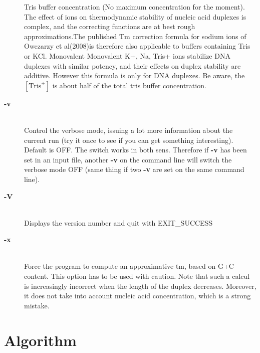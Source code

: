 \documentclass{article}
\begin{document}
\begin{description}
Tris buffer  concentration  (No maximum concentration for the moment). 
The effect  of  ions  on  thermodynamic  stability  of nucleic  acid 
duplexes is complex, and the correcting functions are  at  best
rough  approximations.The published  Tm  correction formula for sodium ions of 
Owczarzy et al(2008)is therefore also applicable to buffers containing Tris or
KCl. Monovalent Monovalent K+, Na, Tris+ ions  stabilize  DNA duplexes with similar potency, and 
their effects on duplex stability are additive. However this formula is only for DNA 
duplexes. Be aware, the $[\mbox{Tris}^+]$ is about half of the total tris buffer
concentration.
\item [\textbf{-v}  ]\mbox{}\\ 
Control the verbose 
mode, issuing a lot more information about the current run  (try it once 
to see if you can get something interesting). Default is OFF. The  switch 
works in both sens. Therefore if  \textbf{-v } has been set in an input file, another 
\textbf{-v } on the command line will switch the verbose mode OFF (same thing if 
two  \textbf{-v } are set on the same command line).  
\item [\textbf{-V}  ]\mbox{}\\ 
Displays the version number 
and quit with EXIT\_SUCCESS 
\item [\textbf{-x}  ]\mbox{}\\ Force the program to compute an approximative 
tm, based on G+C content. This option has to be used with caution. Note 
that such a calcul is increasingly incorrect when the length of  the duplex 
decreases. Moreover, it does not take into account nucleic acid concentration, 
which is a strong mistake.    
  
\end{description}
 
\section{Algorithm }
  
   
\end{document}
